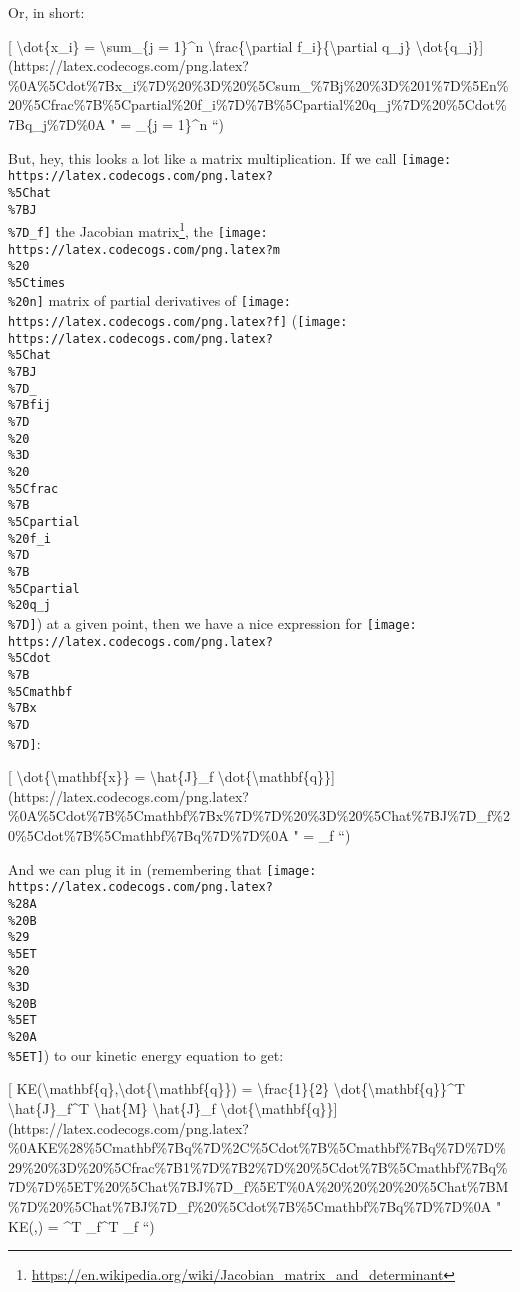 \documentclass[]{article}
\renewcommand{\href}[2]{#2\footnote{\url{#1}}}
\begin{document}
Or, in short:

{[} \textbackslash{}dot\{x\_i\} = \textbackslash{}sum\_\{j = 1\}\^{}n
\textbackslash{}frac\{\textbackslash{}partial f\_i\}\{\textbackslash{}partial
q\_j\}
\textbackslash{}dot\{q\_j\}{]}(https://latex.codecogs.com/png.latex?\%0A\%5Cdot\%7Bx\_i\%7D\%20\%3D\%20\%5Csum\_\%7Bj\%20\%3D\%201\%7D\%5En\%20\%5Cfrac\%7B\%5Cpartial\%20f\_i\%7D\%7B\%5Cpartial\%20q\_j\%7D\%20\%5Cdot\%7Bq\_j\%7D\%0A
"  = \sum\_\{j = 1\}\^{}n  
``)

But, hey, this looks a lot like a matrix multiplication. If we call
\texttt{[image: https://latex.codecogs.com/png.latex?\\\%5Chat\\\%7BJ\\\%7D\_f]} the
\href{https://en.wikipedia.org/wiki/Jacobian_matrix_and_determinant}{Jacobian
matrix}, the
\texttt{[image: https://latex.codecogs.com/png.latex?m\\\%20\\\%5Ctimes\\\%20n]}
matrix of partial derivatives of
\texttt{[image: https://latex.codecogs.com/png.latex?f]}
(\texttt{[image: https://latex.codecogs.com/png.latex?\\\%5Chat\\\%7BJ\\\%7D\_\\\%7Bfij\\\%7D\\\%20\\\%3D\\\%20\\\%5Cfrac\\\%7B\\\%5Cpartial\\\%20f\_i\\\%7D\\\%7B\\\%5Cpartial\\\%20q\_j\\\%7D]})
at a given point, then we have a nice expression for
\texttt{[image: https://latex.codecogs.com/png.latex?\\\%5Cdot\\\%7B\\\%5Cmathbf\\\%7Bx\\\%7D\\\%7D]}:

{[} \textbackslash{}dot\{\textbackslash{}mathbf\{x\}\} =
\textbackslash{}hat\{J\}\_f
\textbackslash{}dot\{\textbackslash{}mathbf\{q\}\}{]}(https://latex.codecogs.com/png.latex?\%0A\%5Cdot\%7B\%5Cmathbf\%7Bx\%7D\%7D\%20\%3D\%20\%5Chat\%7BJ\%7D\_f\%20\%5Cdot\%7B\%5Cmathbf\%7Bq\%7D\%7D\%0A
"  = \_f  ``)

And we can plug it in (remembering that
\texttt{[image: https://latex.codecogs.com/png.latex?\\\%28A\\\%20B\\\%29\\\%5ET\\\%20\\\%3D\\\%20B\\\%5ET\\\%20A\\\%5ET]})
to our kinetic energy equation to get:

{[}
KE(\textbackslash{}mathbf\{q\},\textbackslash{}dot\{\textbackslash{}mathbf\{q\}\})
= \textbackslash{}frac\{1\}\{2\}
\textbackslash{}dot\{\textbackslash{}mathbf\{q\}\}\^{}T
\textbackslash{}hat\{J\}\_f\^{}T \textbackslash{}hat\{M\}
\textbackslash{}hat\{J\}\_f
\textbackslash{}dot\{\textbackslash{}mathbf\{q\}\}{]}(https://latex.codecogs.com/png.latex?\%0AKE\%28\%5Cmathbf\%7Bq\%7D\%2C\%5Cdot\%7B\%5Cmathbf\%7Bq\%7D\%7D\%29\%20\%3D\%20\%5Cfrac\%7B1\%7D\%7B2\%7D\%20\%5Cdot\%7B\%5Cmathbf\%7Bq\%7D\%7D\%5ET\%20\%5Chat\%7BJ\%7D\_f\%5ET\%0A\%20\%20\%20\%20\%5Chat\%7BM\%7D\%20\%5Chat\%7BJ\%7D\_f\%20\%5Cdot\%7B\%5Cmathbf\%7Bq\%7D\%7D\%0A
" KE(,) =  \^{}T
\_f\^{}T  \_f  ``)
\end{document}

